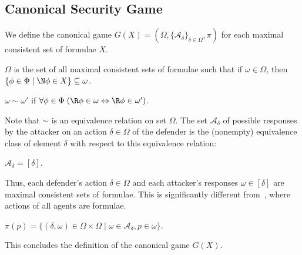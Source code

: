 \documentclass[letterpaper]{article}
\begin{document}
\subsection{Canonical Security Game}

We define the canonical game $G(X)=(\Omega,\{\mathcal{A}_\delta\}_{\delta\in\Omega},\pi)$ for each maximal consistent set of formulae $X$.

\begin{definition}\label{canonical Omega}
$\Omega$ is the set of all maximal consistent sets of formulae such that if $\omega\in\Omega$, then $\{\phi\in\Phi\;|\;\N\phi\in X\}\subseteq \omega$.
\end{definition}


\begin{definition}\label{canonical sim}
$\omega\sim\omega'$ if $\forall\phi\in\Phi\;(\R\phi\in\omega\Leftrightarrow\R\phi\in\omega')$.
\end{definition}

Note that $\sim$ is an equivalence relation on set $\Omega$. The set $\mathcal{A}_\delta$ of possible responses by the  attacker on an action $\delta\in\Omega$ of the defender is the (nonempty) equivalence class of element $\delta$ with respect to this equivalence relation:

\begin{definition}\label{canonical A}
$\mathcal{A}_\delta=[\delta]$.
\end{definition}

Thus, each defender's action $\delta\in \Omega$ and each attacker's responses $\omega\in [\delta]$ are maximal consistent sets of formulae. This is significantly different from~\cite{nt19aaai}, where actions of all agents are formulae.

\begin{definition}\label{canonical pi}
$\pi(p)=\{(\delta,\omega)\in \Omega\times\Omega\;|\;\omega\in\mathcal{A}_\delta, p\in \omega\}$.
\end{definition}
This concludes the definition of the canonical game $G(X)$.
\end{document}

